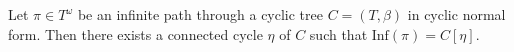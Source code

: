 \begin{lemma}\label{lem:inf-cs}
  Let $\pi \in T^\omega$ be an infinite path through a cyclic tree $C = (T, \beta)$ in cyclic normal form.
  Then there exists a connected cycle $\eta$ of $C$ such that $\text{Inf}(\pi) =
  C[\eta]$.
\end{lemma}

